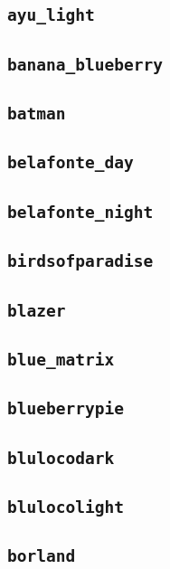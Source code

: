 \subsection{\texttt{ayu\_light}}
\newpage
\subsection{\texttt{banana\_blueberry}}
\newpage
\subsection{\texttt{batman}}
\newpage
\subsection{\texttt{belafonte\_day}}
\newpage
\subsection{\texttt{belafonte\_night}}
\newpage
\subsection{\texttt{birdsofparadise}}
\newpage
\subsection{\texttt{blazer}}
\newpage
\subsection{\texttt{blue\_matrix}}
\newpage
\subsection{\texttt{blueberrypie}}
\newpage
\subsection{\texttt{blulocodark}}
\newpage
\subsection{\texttt{blulocolight}}
\newpage
\subsection{\texttt{borland}}
\newpage
